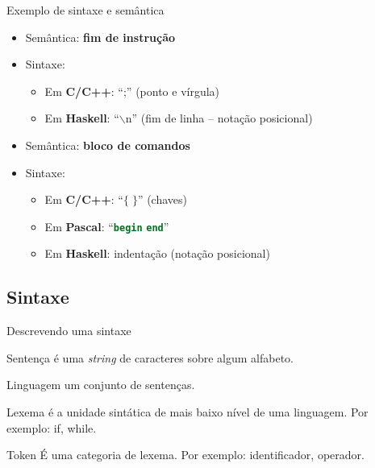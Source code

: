 \documentclass[handout, aspectratio=169]{beamer}
\newcommand{\bi}{\begin{itemize}[<+->]}
\newcommand{\ei}{\end{itemize}}
\begin{document}
\begin{frame}{Exemplo de sintaxe e semântica}
	\bi
	\item Semântica: \textbf{fim de instrução}
	\item Sintaxe:
	\bi
	\item Em \textbf{C/C++}: ``;'' (ponto e vírgula)
	\item Em \textbf{Haskell}: ``$\backslash$n'' (fim de linha -- notação posicional) \\[10mm]
	\ei
	\item Semântica: \textbf{bloco de comandos}
	\item Sintaxe:
	\bi
	\item Em \textbf{C/C++}: ``$\{ \; \}$'' (chaves)
	\item Em \textbf{Pascal}:  ``\lstinline[language=Pascal]|begin| \; \lstinline[language=Pascal]|end|''
	\item Em \textbf{Haskell}: indentação (notação posicional)
	\ei
	\ei
\end{frame}

\subsection{Sintaxe}

\begin{frame}{Descrevendo uma sintaxe}
	\begin{block}{Sentença}
		é uma \textit{string} de caracteres sobre algum alfabeto.
	\end{block}

	\begin{block}{Linguagem}
		um conjunto de sentenças.
	\end{block}

	\begin{block}{Lexema}
		é a unidade sintática de mais baixo nível de uma linguagem. Por exemplo: if, while.
	\end{block}

	\begin{block}{Token}
		É uma categoria de lexema. Por exemplo: identificador, operador.
	\end{block}

\end{frame}
\end{document}
